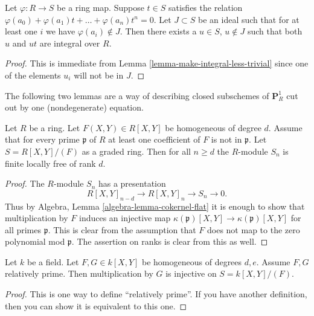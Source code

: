 \begin{lemma}
\label{lemma-make-integral-not-in-ideal}
Let $\varphi : R \to S$ be a ring map.
Suppose $t \in S$ satisfies the
relation $\varphi(a_0) + \varphi(a_1)t + \ldots + \varphi(a_n) t^n = 0$.
Let $J \subset S$ be an ideal such that for at
least one $i$ we have $\varphi(a_i) \not \in J$.
Then there exists a $u \in S$, $u \not\in J$ such
that both $u$ and $ut$ are integral over $R$.
\end{lemma}

\begin{proof}
This is immediate from Lemma \ref{lemma-make-integral-less-trivial}
since one of the elements $u_i$ will not be in $J$.
\end{proof}

\noindent
The following two lemmas are a way of describing closed
subschemes of $\mathbf{P}^1_R$ cut out by one (nondegenerate)
equation.

\begin{lemma}
\label{lemma-P1}
Let $R$ be a ring.
Let $F(X, Y) \in R[X, Y]$ be homogeneous of degree
$d$. Assume that for every prime $\mathfrak p$ of $R$
at least one coefficient of $F$ is not in $\mathfrak p$.
Let $S = R[X, Y]/(F)$ as a graded ring.
Then for all $n \geq d$ the $R$-module $S_n$
is finite locally free of rank $d$.
\end{lemma}

\begin{proof}
The $R$-module $S_n$ has a presentation
$$
R[X, Y]_{n-d} \to R[X, Y]_n \to S_n \to 0.
$$
Thus by Algebra, Lemma \ref{algebra-lemma-cokernel-flat}
it is enough to show that multiplication
by $F$ induces an injective map
$\kappa(\mathfrak p)[X, Y]
\to \kappa(\mathfrak p)[X, Y]$
for all primes $\mathfrak p$.
This is clear from the assumption that
$F$ does not map to the zero polynomial mod $\mathfrak p$.
The assertion on ranks is clear from this as well.
\end{proof}

\begin{lemma}
\label{lemma-rel-prime-pols}
Let $k$ be a field. Let $F, G \in k[X, Y]$ be homogeneous
of degrees $d, e$. Assume $F, G$ relatively prime.
Then multiplication by $G$ is injective on $S = k[X, Y]/(F)$.
\end{lemma}

\begin{proof}
This is one way to define ``relatively prime''. If you have another
definition, then you can show it is equivalent to this one.
\end{proof}

